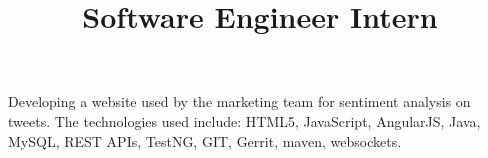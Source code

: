 \begin{resume}
\begin{position}

        \end{position}

        \title{Software Engineer Intern}
        \begin{position}
            Developing a website used by the marketing team for sentiment analysis on tweets.
            The technologies used include: HTML5, JavaScript, AngularJS, Java, MySQL, REST APIs, TestNG, GIT, Gerrit, maven, websockets.
        \end{position}


%


\end{resume}
